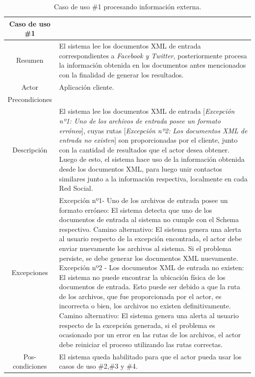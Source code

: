 \begin{table}[H]
\begin{center}
\caption[Caso de uso \#1 procesando información externa.]{Caso de uso \#1 procesando información externa.}
\label{tab:des-tab01}
\begin{tabular}{|c|>{\raggedright}p{10cm}|}
\hline 
Caso de uso \#1 & \multicolumn{1}{l|}{Procesando información externa.}\tabularnewline
\hline 
\hline 
Resumen & El sistema lee los documentos XML de entrada correspondientes a \emph{Facebook
y Twitter}, posteriormente procesa la información obtenida en los
documentos antes mencionados con la finalidad de generar los resultados.\tabularnewline
\hline 
Actor & Aplicación cliente.\tabularnewline
\hline 
Precondiciones & \multicolumn{1}{l|}{La existencia de documentos XML de entrada.}\tabularnewline
\hline 
Descripción & El sistema lee los documentos XML de entrada {[}\emph{Excepción nº1:
Uno de los archivos de entrada posee un formato erróneo}{]}, cuyas
rutas {[}\emph{Excepción nº2: Los documentos XML de entrada no existen}{]}
son proporcionadas por el cliente, junto con la cantidad de resultados
que el actor desea obtener. Luego de esto, el sistema hace uso de
la información obtenida desde los documentos XML, para luego unir
contactos similares junto a la información respectiva, localmente
en cada Red Social.\tabularnewline
\hline 
Excepciones & Excepción nº1- Uno de los archivos de entrada posee un formato erróneo:
El sistema detecta que uno de los documentos de entrada al sistema
no cumple con el Schema respectivo. Camino alternativo: El sistema
genera una alerta al usuario respecto de la excepción encontrada,
el actor debe enviar nuevamente los archivos al sistema. Si el problema
persiste, se debe generar los documentos XML nuevamente. \textcompwordmark{}Excepción
nº2 - Los documentos XML de entrada no existen: El sistema no puede
encontrar la ubicación física de los documentos de entrada. Esto puede
ser debido a que la ruta de los archivos, que fue proporcionada por
el actor, es incorrecta o bien, los archivos no existen definitivamente.
Camino alternativo: El sistema genera una alerta al usuario respecto
de la excepción generada, si el problema es ocasionado por un error
en las rutas de los archivos, el actor debe reiniciar el proceso utilizando
las rutas correctas.\tabularnewline
\hline 
Pos-condiciones & El sistema queda habilitado para que el actor pueda usar los casos
de uso \#2,\#3 y \#4.\tabularnewline
\hline 
\end{tabular}
\end{center}
\end{table}


